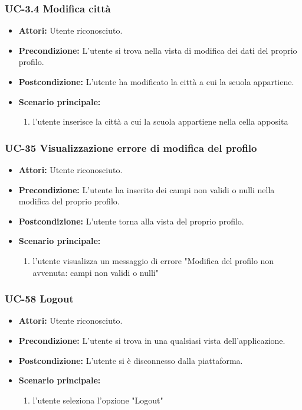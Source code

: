 \subsubsection{UC-3.4 Modifica città}
\begin{itemize}
			\item \textbf{Attori:} Utente riconosciuto.
			\item \textbf{Precondizione:} L'utente si trova nella vista di modifica dei dati del proprio profilo.
			\item \textbf{Postcondizione:} L'utente ha modificato la città a cui la scuola appartiene.
			\item \textbf{Scenario principale:}
			\begin{enumerate}
				\item l'utente inserisce la città a cui la scuola appartiene nella cella apposita
			\end{enumerate}
\end{itemize}

\subsubsection{UC-35 Visualizzazione errore di modifica del profilo}	
	\begin{itemize}
		\item \textbf{Attori:} Utente riconosciuto.
		\item \textbf{Precondizione:} L'utente ha inserito dei campi non validi o nulli nella modifica del proprio profilo.
		\item \textbf{Postcondizione:} L'utente torna alla vista del proprio profilo.
		\item \textbf{Scenario principale:}
		\begin{enumerate}
			\item l'utente visualizza un messaggio di errore "Modifica del profilo non avvenuta: campi non validi o nulli"
		\end{enumerate}
	\end{itemize}

\subsubsection{UC-58 Logout}
\begin{itemize}
		\item \textbf{Attori:} Utente riconosciuto.
		\item \textbf{Precondizione:} L'utente si trova in una qualsiasi vista dell'applicazione.
		\item \textbf{Postcondizione:} L'utente si è disconnesso dalla piattaforma.
		\item \textbf{Scenario principale:}
		\begin{enumerate}
			\item l'utente seleziona l'opzione "Logout"
		\end{enumerate}
	\end{itemize}

